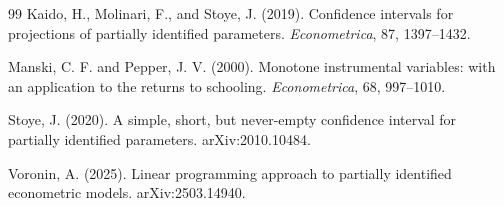 \documentclass[11pt]{article}
\theoremstyle{definition}
\theoremstyle{plain}
\theoremstyle{remark}
\begin{document}
\begin{thebibliography}{99}
Kaido, H., Molinari, F., and Stoye, J. (2019).
Confidence intervals for projections of partially identified parameters.
\textit{Econometrica}, 87, 1397--1432.

Manski, C. F. and Pepper, J. V. (2000).
Monotone instrumental variables: with an application to the returns to
schooling.
\textit{Econometrica}, 68, 997--1010.

Stoye, J. (2020).
A simple, short, but never-empty confidence interval for partially identified
parameters.
arXiv:2010.10484.

Voronin, A. (2025).
Linear programming approach to partially identified econometric models.
arXiv:2503.14940.
\end{thebibliography}
\end{document}
